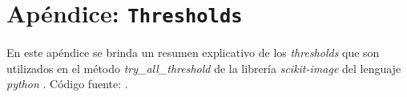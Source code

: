 \newcommand{\mychapter}[2]{
    \setcounter{chapter}{#1}
    \setcounter{section}{0}
    \chapter*{#2}	
}
\singlespacing
\mychapter{0}{Apéndice: \texttt{Thresholds}}
\label{chap:apendthresh}

\pagestyle{plain}

En este apéndice se brinda un resumen explicativo de los \textit{thresholds} que son utilizados en el método \textit{try\_all\_threshold} de la librería \textit{scikit-image} del lenguaje \textit{python} \cite{van2014scikit}.
Código fuente: \href{https://github.com/scikit-image/scikit-image/blob/master/skimage/filters/thresholding.py}{\faGithub}.

